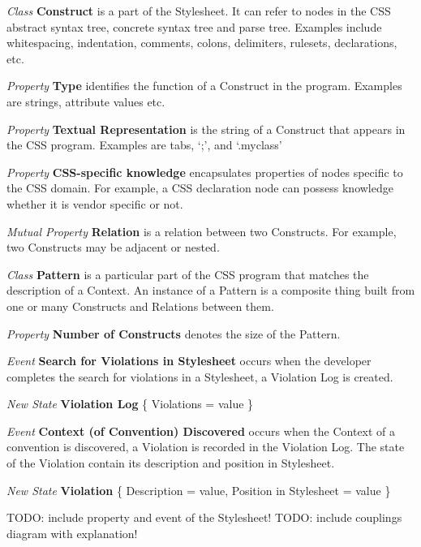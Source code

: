 \documentclass[parskip=full]{uvamscse}
\begin{document}
\begin{description}
\item\textit{Class} \textbf{Construct} is a part of the Stylesheet. It can refer to nodes in the CSS abstract syntax tree, concrete syntax tree and parse tree. Examples include whitespacing, indentation, comments, colons, delimiters, rulesets, declarations, etc.

\textit{Property} \textbf{Type} identifies the function of a Construct in the program. Examples are strings, attribute values etc.

\textit{Property} \textbf{Textual Representation} is the string of a Construct that appears in the CSS program. Examples are tabs, ‘;’, and ‘.myclass’

\textit{Property} \textbf{CSS-specific knowledge} encapsulates properties of nodes specific to the CSS domain. For example, a CSS declaration node can possess knowledge whether it is vendor specific or not.

\textit{Mutual Property} \textbf{Relation} is a relation between two Constructs. For example, two Constructs may be adjacent or nested.


\item\textit{Class} \textbf{Pattern} is a particular part of the CSS program that matches the description of a Context. An instance of a Pattern is a composite thing built from one or many Constructs and Relations between them.

\textit{Property} \textbf{Number of Constructs} denotes the size of the Pattern.


\item\textit{Event} \textbf{Search for Violations in Stylesheet} occurs when the developer completes the search for violations in a Stylesheet, a Violation Log is created.

\textit{New State} \textbf{Violation Log} \{ Violations = value \}


\item\textit{Event} \textbf{Context (of Convention) Discovered} occurs when the Context of a convention is discovered, a Violation is recorded in the Violation Log. The state of the Violation contain its description and position in Stylesheet.

\textit{New State} \textbf{Violation} \{ Description = value, Position in Stylesheet = value \}

TODO: include property and event of the Stylesheet!
TODO: include couplings diagram with explanation!


\end{description}
\end{document}
